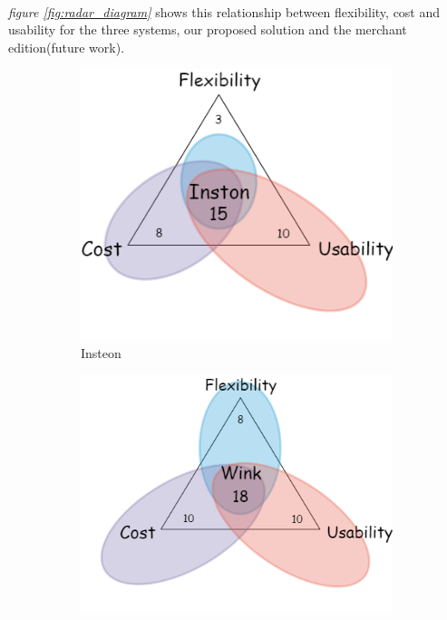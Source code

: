 \documentclass[12pt]{paper}
\begin{document}
		\paragraph{} \textit{figure \ref{fig:radar_diagram}} shows this relationship between flexibility, cost and usability for the three systems, our proposed solution and the merchant edition(future work).

		\begin{figure}[H]
			\centering
			\begin{subfigure}[b]{.4\linewidth}
				\includegraphics[width=\linewidth]{img/Inston.png}
				\caption{Insteon}
			\end{subfigure}
			\begin{subfigure}[b]{.4\linewidth}
				\includegraphics[width=\linewidth]{img/Wink.png}

\end{subfigure}
\end{figure}
\end{document}
